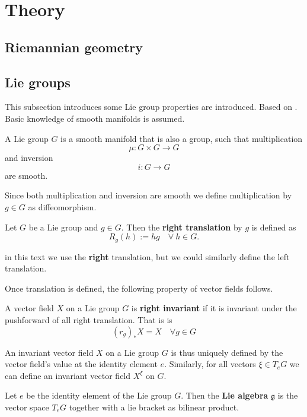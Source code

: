 
\section{Theory}
\subsection{Riemannian geometry}

\subsection{Lie groups}
This subsection introduces some  Lie group properties are introduced. Based on \cite{celledoni2016}. Basic knowledge of smooth manifolds is assumed.
\begin{definition}
  A Lie group  \(G\) is a smooth manifold that is also a group, such that multiplication
  \begin{equation*}
    \mu : G \times G \rightarrow G
  \end{equation*}
  and inversion
  \begin{equation*}
    i : G  \rightarrow G
  \end{equation*}
  are smooth.
\end{definition}
Since both  multiplication and inversion are smooth we define multiplication by  \(g \in G\) as diffeomorphism.
\begin{definition}
  Let  \(G\) be a Lie group and  \(g \in G\). Then the \textbf{right translation} by  \(g\) is defined as
  \begin{equation*}
    R_g(h):= hg \quad  \forall \ h  \in G.
  \end{equation*}
\end{definition}
\begin{remark}
  in this text we use the \textbf{right} translation, but we could similarly define the left translation.
\end{remark}
Once translation is defined, the following property of vector fields follows.
\begin{definition}
  A vector field  \(X\) on a Lie group  \(G\) is \textbf{right invariant} if it is invariant under the pushforward of all right translation. That is is
  \begin{equation*}
    (r_g)_*X = X  \quad \forall g \in G
  \end{equation*}
\end{definition}
An invariant vector field  \(X\) on a Lie group  \(G\) is thus uniquely defined by the vector field's value at the identity element  \(e\). Similarly, for all vectors  \(\xi \in T_eG\) we can define an invariant vector field   \(X^{\xi}\) on  \(G\).
\begin{definition}
  Let  \(e\) be the identity element of the Lie group  \(G\). Then the \textbf{Lie algebra}  \(\mathfrak{g}\) is the vector space  \(T_{e}G\) together with a lie bracket as bilinear product.
\end{definition}
